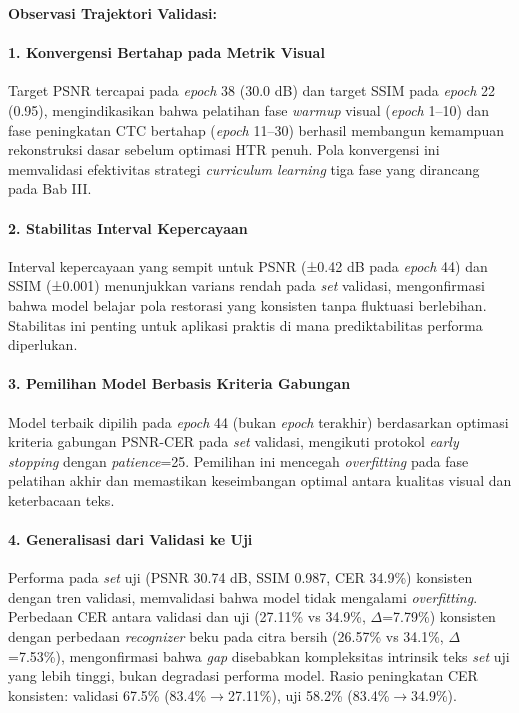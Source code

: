 \documentclass[12pt,a4paper]{article}
\begin{document}
\textbf{Observasi Trajektori Validasi:}

\paragraph{1. Konvergensi Bertahap pada Metrik Visual}
Target PSNR tercapai pada \textit{epoch} 38 (30.0 dB) dan target SSIM pada \textit{epoch} 22 (0.95), mengindikasikan bahwa pelatihan fase \textit{warmup} visual (\textit{epoch} 1--10) dan fase peningkatan CTC bertahap (\textit{epoch} 11--30) berhasil membangun kemampuan rekonstruksi dasar sebelum optimasi HTR penuh. Pola konvergensi ini memvalidasi efektivitas strategi \textit{curriculum learning} tiga fase yang dirancang pada Bab III.

\paragraph{2. Stabilitas Interval Kepercayaan}
Interval kepercayaan yang sempit untuk PSNR (±0.42 dB pada \textit{epoch} 44) dan SSIM (±0.001) menunjukkan varians rendah pada \textit{set} validasi, mengonfirmasi bahwa model belajar pola restorasi yang konsisten tanpa fluktuasi berlebihan. Stabilitas ini penting untuk aplikasi praktis di mana prediktabilitas performa diperlukan.

\paragraph{3. Pemilihan Model Berbasis Kriteria Gabungan}
Model terbaik dipilih pada \textit{epoch} 44 (bukan \textit{epoch} terakhir) berdasarkan optimasi kriteria gabungan PSNR-CER pada \textit{set} validasi, mengikuti protokol \textit{early stopping} dengan \textit{patience}=25. Pemilihan ini mencegah \textit{overfitting} pada fase pelatihan akhir dan memastikan keseimbangan optimal antara kualitas visual dan keterbacaan teks.

\paragraph{4. Generalisasi dari Validasi ke Uji}
Performa pada \textit{set} uji (PSNR 30.74 dB, SSIM 0.987, CER 34.9\%) konsisten dengan tren validasi, memvalidasi bahwa model tidak mengalami \textit{overfitting}. Perbedaan CER antara validasi dan uji (27.11\% vs 34.9\%, $\Delta$=7.79\%) konsisten dengan perbedaan \textit{recognizer} beku pada citra bersih (26.57\% vs 34.1\%, $\Delta$=7.53\%), mengonfirmasi bahwa \textit{gap} disebabkan kompleksitas intrinsik teks \textit{set} uji yang lebih tinggi, bukan degradasi performa model. Rasio peningkatan CER konsisten: validasi 67.5\% (83.4\%$\rightarrow$27.11\%), uji 58.2\% (83.4\%$\rightarrow$34.9\%).
\end{document}
